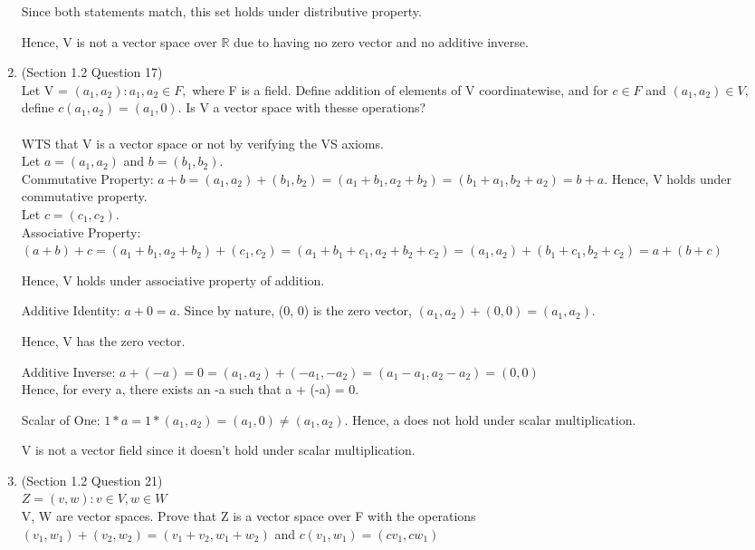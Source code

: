 \documentclass[12pt]{article}
\begin{document}
\begin{enumerate}
        Since both statements match, this set holds under distributive property. 

        Hence, V is not a vector space over $\mathbb{R}$ due to having no zero vector and no additive inverse.

        \qedsymbol{}
        
    \item (Section 1.2 Question 17) \\
        Let V = ${(a_1, a_2): a_1, a_2 \in F},$ where F is a field. Define addition of elements of V coordinatewise, and for $c \in F$ and $(a_1, a_2) \in V$, define $c(a_1, a_2) = (a_1, 0)$. Is V a vector space with thesse operations? \\
        \\
        WTS that V is a vector space or not by verifying the VS axioms.\\
        Let $a = (a_1, a_2)$ and $b = (b_1, b_2)$. \\
        Commutative Property:
        $a + b = (a_1, a_2) + (b_1, b_2) = (a_1 + b_1, a_2 + b_2) = (b_1 + a_1, b_2 + a_2) = b + a$. 
        Hence, V holds under commutative property. \\

        Let $c = (c_1, c_2)$. \\
        Associative Property:
        $(a + b) + c = (a_1 + b_1, a_2 + b_2) + (c_1, c_2) = (a_1 + b_1 + c_1, a_2 + b_2 + c_2) = (a_1, a_2) + (b_1 + c_1, b_2 + c_2) = a + (b + c)$
        
        Hence, V holds under associative property of addition.

        Additive Identity: 
        $a + 0 = a$. Since by nature, (0, 0) is the zero vector, $(a_1, a_2) + (0,0) = (a_1, a_2)$. 

        Hence, V has the zero vector.

        Additive Inverse:
        $a + (-a) = 0 = (a_1, a_2) + (-a_1, -a_2) = (a_1 - a_1, a_2 - a_2) = (0, 0)$ \\
        Hence, for every a, there exists an -a such that a + (-a) = 0. 

        Scalar of One:
        $1 * a = 1 * (a_1, a_2) = (a_1, 0) \neq (a_1, a_2)$.
        Hence, a does not hold under scalar multiplication.

        V is not a vector field since it doesn't hold under scalar multiplication. \qedsymbol{}
        
        
    \item (Section 1.2 Question 21) \\
        $Z = {(v, w): v \in V, w \in W}$ \\
        V, W are vector spaces.
        Prove that Z is a vector space over F with the operations \\
        $(v_1, w_1) + (v_2, w_2) = (v_1 + v_2, w_1 + w_2)$ and $c(v_1, w_1) = (cv_1, cw_1)$
        

\end{enumerate}
\end{document}
